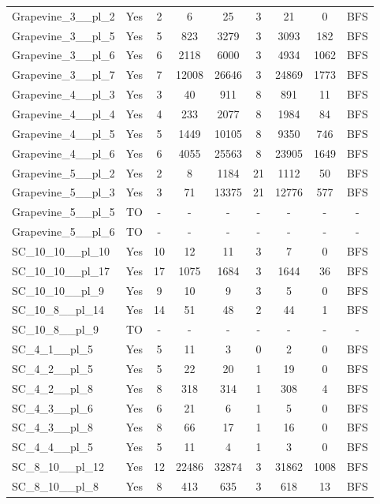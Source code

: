 \documentclass{article}
\begin{document}
\begin{tabular}{lcccccccc}
Grapevine\_3\_\_pl\_2 & Yes & 2 & 6 & 25 & 3 & 21 & 0 & BFS \\
Grapevine\_3\_\_pl\_5 & Yes & 5 & 823 & 3279 & 3 & 3093 & 182 & BFS \\
Grapevine\_3\_\_pl\_6 & Yes & 6 & 2118 & 6000 & 3 & 4934 & 1062 & BFS \\
Grapevine\_3\_\_pl\_7 & Yes & 7 & 12008 & 26646 & 3 & 24869 & 1773 & BFS \\
Grapevine\_4\_\_pl\_3 & Yes & 3 & 40 & 911 & 8 & 891 & 11 & BFS \\
Grapevine\_4\_\_pl\_4 & Yes & 4 & 233 & 2077 & 8 & 1984 & 84 & BFS \\
Grapevine\_4\_\_pl\_5 & Yes & 5 & 1449 & 10105 & 8 & 9350 & 746 & BFS \\
Grapevine\_4\_\_pl\_6 & Yes & 6 & 4055 & 25563 & 8 & 23905 & 1649 & BFS \\
Grapevine\_5\_\_pl\_2 & Yes & 2 & 8 & 1184 & 21 & 1112 & 50 & BFS \\
Grapevine\_5\_\_pl\_3 & Yes & 3 & 71 & 13375 & 21 & 12776 & 577 & BFS \\
Grapevine\_5\_\_pl\_5 & TO & - & - & - & - & - & - & - \\
Grapevine\_5\_\_pl\_6 & TO & - & - & - & - & - & - & - \\
SC\_10\_10\_\_pl\_10 & Yes & 10 & 12 & 11 & 3 & 7 & 0 & BFS \\
SC\_10\_10\_\_pl\_17 & Yes & 17 & 1075 & 1684 & 3 & 1644 & 36 & BFS \\
SC\_10\_10\_\_pl\_9 & Yes & 9 & 10 & 9 & 3 & 5 & 0 & BFS \\
SC\_10\_8\_\_pl\_14 & Yes & 14 & 51 & 48 & 2 & 44 & 1 & BFS \\
SC\_10\_8\_\_pl\_9 & TO & - & - & - & - & - & - & - \\
SC\_4\_1\_\_pl\_5 & Yes & 5 & 11 & 3 & 0 & 2 & 0 & BFS \\
SC\_4\_2\_\_pl\_5 & Yes & 5 & 22 & 20 & 1 & 19 & 0 & BFS \\
SC\_4\_2\_\_pl\_8 & Yes & 8 & 318 & 314 & 1 & 308 & 4 & BFS \\
SC\_4\_3\_\_pl\_6 & Yes & 6 & 21 & 6 & 1 & 5 & 0 & BFS \\
SC\_4\_3\_\_pl\_8 & Yes & 8 & 66 & 17 & 1 & 16 & 0 & BFS \\
SC\_4\_4\_\_pl\_5 & Yes & 5 & 11 & 4 & 1 & 3 & 0 & BFS \\
SC\_8\_10\_\_pl\_12 & Yes & 12 & 22486 & 32874 & 3 & 31862 & 1008 & BFS \\
SC\_8\_10\_\_pl\_8 & Yes & 8 & 413 & 635 & 3 & 618 & 13 & BFS \\

\end{tabular}
\end{document}
